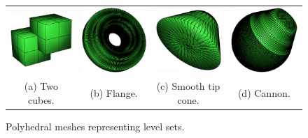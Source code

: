 \begin{figure}
\centering
\begin{tabular}{cccc}
\includegraphics[width=1.6in]{images/twocubes_mesh.eps} &
\includegraphics[width=1.6in]{images/flange_mesh.eps} &
\includegraphics[width=1.6in]{images/smooth_tip_cone_mesh.eps} &
\includegraphics[width=1.6in]{images/cannon_mesh.eps}
\\
(a) Two cubes. & (b) Flange. & (c) Smooth tip cone. & (d) Cannon. \\
\end{tabular}
\caption{Polyhedral meshes representing level sets.}
\label{fig:mesh}
\end{figure}


